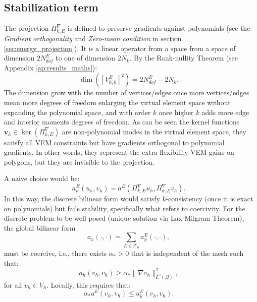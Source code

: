 \documentclass{article}
\begin{document}
\subsection{Stabilization term}
\label{sec:stabilization_term}

The projection $\Pi^\nabla_{k,E}$ is defined to preserve gradients against polynomials (see the \textit{Gradient orthogonality} and \textit{Zero-mean condition} in section \ref{sec:energy_projection}). It is a linear operator from a space from a space of dimension $2N_{dof}^E$ to one of dimension $2N_k$. By the Rank-nullity Theorem (see Appendix \ref{ap:results_maths}):
\begin{equation}
    \nonumber
    \dim ([V_{h,k}^E]^2)= 2N_{dof}^E - 2 N_k.
\end{equation}
The dimension grow with the number of vertices/edges once more vertices/edges mean more degrees of freedom enlarging the virtual element space without expanding the polynomial space, and with order $k$ once higher $k$ adds more edge and interior moments degrees of freedom. As can be seen the kernel functions $\mathbf{v}_h\in \ker (\Pi^\nabla_{k,E})$ are non-polynomial modes in the virtual element space, they satisfy all VEM constraints but have gradients orthogonal to polynomial gradients. In other words, they represent the extra flexibility VEM gains on polygons, but they are invisible to the projection. 

A naive choice would be:
\begin{equation}
    \nonumber
    a^E_h(u_h, v_h) = a^E (\Pi^\nabla_{k,E}u_h, \Pi^\nabla_{k,E}v_h).
\end{equation}
In this way, the discrete bilinear form would satisfy $k$-consistency (once it is exact on polynomials) but fails stability, specifically what refers to coercivity. For the discrete problem to be well-posed (unique solution via Lax-Milgram Theorem), the global bilinear form 
\begin{equation}
    \nonumber
    a_h(\cdot, \cdot ) = \sum \limits_{E \in \mathcal{T}_h}a^E_h(\cdot, \cdot),
\end{equation}
must be coercive, i.e., there exists $\alpha_* > 0$ that is independent of the mesh such that:
\begin{equation}
    \nonumber
    a_h(v_h, v_h) \geq \alpha_* \| \nabla v_h \|_{L^2(\Omega)}^2,
\end{equation}
for all $v_h \in V_h$. Locally, this requires that:
\begin{equation}
    \nonumber
    \alpha_* a^E(v_h, v_h) \leq a^E_h(v_h, v_h).
\end{equation}
\end{document}
